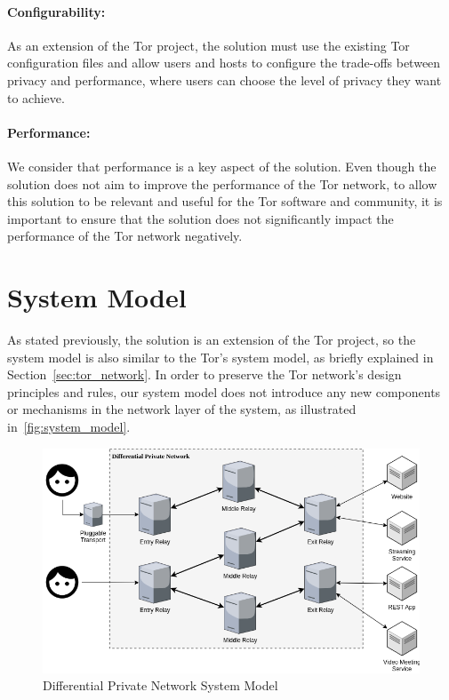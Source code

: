 \paragraph{Configurability:} As an extension of the Tor project, the solution must use the existing Tor configuration files and allow users and hosts to configure the trade-offs between privacy and performance, where users can choose the level of privacy they want to achieve.
\paragraph{Performance:} We consider that performance is a key aspect of the solution. Even though the solution does not aim to improve the performance of the Tor network, to allow this solution to be relevant and useful for the Tor software and community, it is important to ensure that the solution does not significantly impact the performance of the Tor network negatively. 


\section{System Model}\label{sec:system_model}

As stated previously, the solution is an extension of the Tor project, so the system model is also similar to the Tor's system model, as briefly explained in Section~\ref{sec:tor_network}. In order to preserve the Tor network's design principles and rules, our system model does not introduce any new components or mechanisms in the network layer of the system, as illustrated in~\autoref{fig:system_model}. 

\begin{figure}[!h]
  \centering
  \includegraphics[width=\textwidth]{Chapters/Figures/System_Model_Geral.png}
  \caption{Differential Private Network System Model}\label{fig:system_model}
\end{figure}

